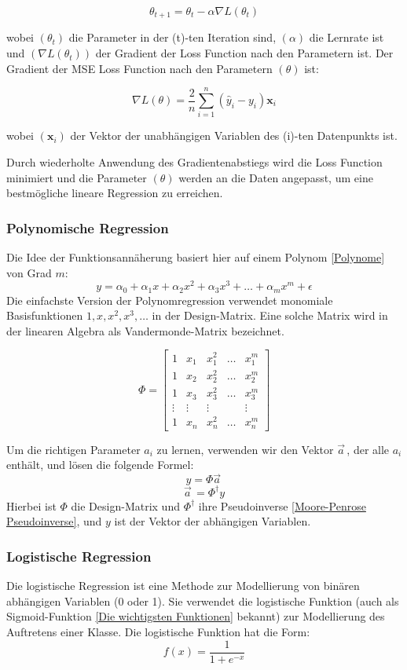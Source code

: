 \documentclass[letterpaper, titlepage]{article}
\begin{document}
$$\theta_{t+1} = \theta_t - \alpha \nabla L(\theta_t)$$

wobei $(\theta_t)$ die Parameter in der (t)-ten Iteration sind, $(\alpha)$ die Lernrate ist und $(\nabla L(\theta_t))$ der Gradient der Loss Function nach den Parametern ist. Der Gradient der MSE Loss Function nach den Parametern $(\theta)$ ist:

$$\nabla L(\theta) = \frac{2}{n} \sum_{i=1}^{n} (\hat{y}_i - y_i) \mathbf{x}_i$$

wobei $(\mathbf{x}_i)$ der Vektor der unabhängigen Variablen des (i)-ten Datenpunkts ist.

Durch wiederholte Anwendung des Gradientenabstiegs wird die Loss Function minimiert und die Parameter $(\theta)$ werden an die Daten angepasst, um eine bestmögliche lineare Regression zu erreichen.

\subsubsection{Polynomische Regression}\label{Polynomilae Regression}
Die Idee der Funktionsannäherung basiert hier auf einem Polynom \ref{Polynome} von Grad $m$:
$$y = \alpha_0 + \alpha_1x + \alpha_2x^2 + \alpha_3x^3 + \dots + \alpha_mx^m + \epsilon$$
Die einfachste Version der Polynomregression verwendet monomiale Basisfunktionen ${1, x, x^2, x^3, \dots }$ in der Design-Matrix. Eine solche Matrix wird in der linearen Algebra als Vandermonde-Matrix bezeichnet.

$$ \Phi = \begin{bmatrix} 1 & x_1 & x_1^2 & \dots & x_1^m \\ 1 & x_2 & x_2^2 & \dots & x_2^m \\ 1 & x_3 & x_3^2 & \dots & x_3^m \\ \vdots & \vdots & \vdots & & \vdots \\ 1 & x_n & x_n^2 & \dots & x_n^m \end{bmatrix}$$

Um die richtigen Parameter $a_i$ zu lernen, verwenden wir den Vektor $\vec{a}^{\,}$, der alle $a_i$ enthält, und lösen die folgende Formel:
$$y = \Phi \vec{a}^{\,}$$
$$\vec{a}^{\,} = \Phi^\dagger y$$
Hierbei ist $\Phi$ die Design-Matrix und $\Phi^\dagger$ ihre Pseudoinverse \ref{Moore-Penrose Pseudoinverse}, und $y$ ist der Vektor der abhängigen Variablen.

\vspace*{0.35cm}

\subsubsection{Logistische Regression}\label{Logistische Regression}
Die logistische Regression ist eine Methode zur Modellierung von binären abhängigen Variablen (0 oder 1). Sie verwendet die logistische Funktion (auch als Sigmoid-Funktion \ref{Die wichtigsten Funktionen} bekannt) zur Modellierung des Auftretens einer Klasse. Die logistische Funktion hat die Form:
\begin{equation}
f(x) = \frac{1}{1 + e^{-x}}
\end{equation}
\end{document}
